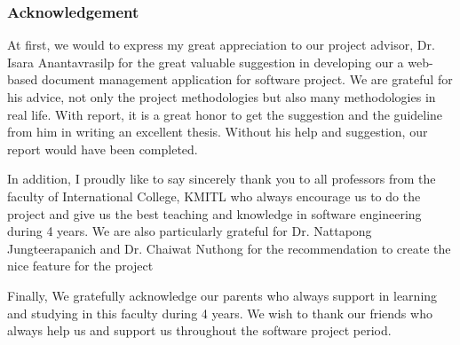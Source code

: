 \subsubsection{\huge{Acknowledgement}}
At first, we would to express my great appreciation to our project advisor, Dr. Isara Anantavrasilp for the great valuable suggestion in developing our a web-based document management application for software project. We are grateful for his advice, not only the project methodologies but also many methodologies in real life. With report, it is a great honor to get the suggestion and the guideline from him in writing an excellent thesis. Without his help and suggestion, our report would have been completed.

In addition, I proudly like to say sincerely thank you to all professors from the faculty
of International College, KMITL who always encourage us to do the project and give us the
best teaching and knowledge in software engineering during 4 years. We are also particularly grateful for Dr. Nattapong Jungteerapanich and Dr. Chaiwat Nuthong for the recommendation to create the nice feature for the project

Finally, We gratefully acknowledge our parents who always support in learning and
studying in this faculty during 4 years. We wish to thank our friends who always help
us and support us throughout the software project period.
